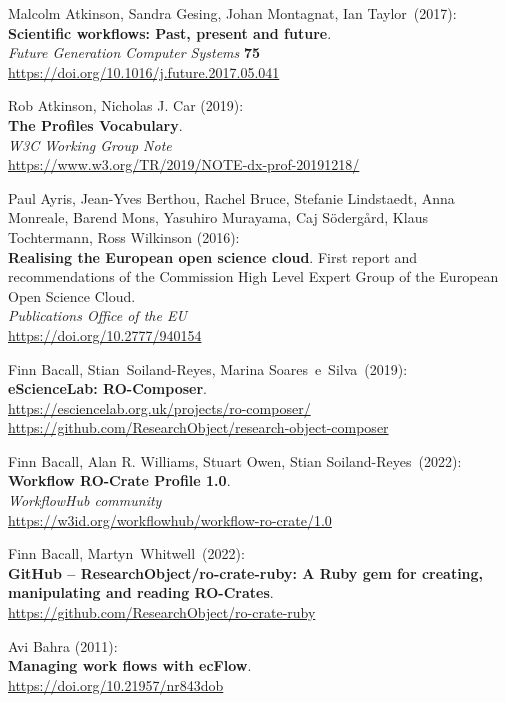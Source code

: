 \begin{thebibliography}{9}
Malcolm Atkinson, Sandra Gesing, Johan Montagnat, Ian Taylor~(2017):\\
\textbf{Scientific workflows: Past, present and future}.\\
\emph{Future Generation Computer Systems} \textbf{75}\\
\url{https://doi.org/10.1016/j.future.2017.05.041}

Rob Atkinson, Nicholas J. Car (2019):\\
\textbf{The Profiles Vocabulary}.\\
\emph{W3C Working Group Note}\\
\url{https://www.w3.org/TR/2019/NOTE-dx-prof-20191218/}

Paul Ayris, Jean-Yves Berthou, Rachel Bruce, Stefanie Lindstaedt, Anna Monreale, Barend Mons, Yasuhiro Murayama, Caj Södergård, Klaus Tochtermann, Ross Wilkinson (2016): \\ 
\textbf{Realising the European open science cloud}. 
First report and recommendations of the Commission High Level Expert Group of the European Open Science Cloud.\\
\emph{Publications Office of the EU} \\
\url{https://doi.org/10.2777/940154}

Finn Bacall, Stian~Soiland-Reyes, Marina Soares~e~Silva~(2019):\\
\textbf{eScienceLab: RO-Composer}.\\
\url{https://esciencelab.org.uk/projects/ro-composer/}\\
\url{https://github.com/ResearchObject/research-object-composer}

Finn Bacall, Alan R. Williams, Stuart Owen, Stian
Soiland-Reyes~(2022):\\
\textbf{Workflow RO-Crate Profile 1.0}.\\
\emph{WorkflowHub community}\\
\url{https://w3id.org/workflowhub/workflow-ro-crate/1.0}

Finn Bacall, Martyn~Whitwell~(2022):\\
\textbf{GitHub -- ResearchObject/ro-crate-ruby: A Ruby gem for creating,
manipulating and reading RO-Crates}.\\
\url{https://github.com/ResearchObject/ro-crate-ruby}

Avi Bahra (2011):\\
\textbf{Managing work flows with ecFlow}.\\
\url{https://doi.org/10.21957/nr843dob}


\end{thebibliography}
